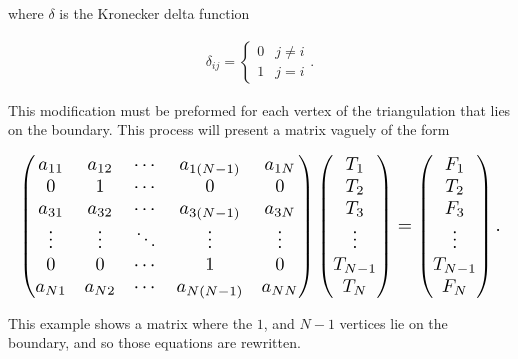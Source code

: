 \documentclass[../fem.tex]{subfiles}
\begin{document}
where $\delta$ is the Kronecker delta function

\begin{align*}
  \delta_{ij}=\begin{cases}
    0 & j\neq i\\
    1 & j = i
  \end{cases}.
\end{align*}

This modification must be preformed for each vertex of the triangulation that
lies on the boundary. This process will present a matrix vaguely of the form

\begin{align*}
  \resizebox{\columnwidth}{!}{$
  \begin{pmatrix}
    a_{11} & a_{12} & \cdots & a_{1(N-1)}& a_{1N}\\
    0 & 1 & \cdots & 0 & 0\\
    a_{31} & a_{32} & \cdots & a_{3(N-1)} & a_{3N}\\
    \vdots & \vdots & \ddots & \vdots & \vdots\\
    0 & 0 & \cdots & 1 & 0\\
    a_{N1} & a_{N2} & \cdots & a_{N(N-1)} & a_{NN}
  \end{pmatrix}
  \begin{pmatrix}
    T_1 \\ T_2 \\ T_3 \\ \vdots \\ T_{N-1} \\ T_N
  \end{pmatrix}
  =
  \begin{pmatrix}
    F_1 \\ T_2 \\ F_3 \\ \vdots \\ T_{N-1} \\ F_N
\end{pmatrix}.$}
\end{align*}

This example shows a matrix where the $1$, and $N-1$ vertices lie on the
boundary, and so those equations are rewritten.
\end{document}
